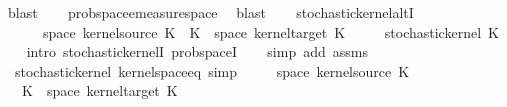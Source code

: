 \begin{isabellebody}
\ blast\isanewline
\ \ \isamarkupfalse%
\ prob{\isacharunderscore}{\kern0pt}space{\isachardot}{\kern0pt}emeasure{\isacharunderscore}{\kern0pt}space{\isacharunderscore}{\kern0pt}{}\ \isamarkupfalse%
\ blast\isanewline
\ \ \isamarkupfalse%
%
\endisatagproof
{\isafoldproof}%
%
\isadelimproof
\isanewline
%
\endisadelimproof
\isanewline
{}\isamarkupfalse%
\ stochastic{\isacharunderscore}{\kern0pt}kernel{\isacharunderscore}{\kern0pt}altI{\isacharcolon}{\kern0pt}\isanewline
\ \ \ {\isachardoublequoteopen}{\isasymAnd}{\isasymomega}{\isachardot}{\kern0pt}\ {\isasymomega}\ {\isasymin}\ space\ {\isacharparenleft}{\kern0pt}kernel{\isacharunderscore}{\kern0pt}source\ K{\isacharparenright}{\kern0pt}\ {\isasymLongrightarrow}\ K\ {\isasymomega}\ {\isacharparenleft}{\kern0pt}space\ {\isacharparenleft}{\kern0pt}kernel{\isacharunderscore}{\kern0pt}target\ K{\isacharparenright}{\kern0pt}{\isacharparenright}{\kern0pt}\ {\isacharequal}{\kern0pt}\ {}{\isachardoublequoteclose}\isanewline
\ \ \ {\isachardoublequoteopen}stochastic{\isacharunderscore}{\kern0pt}kernel\ K{\isachardoublequoteclose}\isanewline
%
\isadelimproof
\ \ %
\endisadelimproof
%
\isatagproof
{}\isamarkupfalse%
\ {\isacharparenleft}{\kern0pt}intro\ stochastic{\isacharunderscore}{\kern0pt}kernelI\ prob{\isacharunderscore}{\kern0pt}spaceI{\isacharparenright}{\kern0pt}\isanewline
\ \ \isamarkupfalse%
\ {\isacharparenleft}{\kern0pt}simp\ add{\isacharcolon}{\kern0pt}\ assms{\isacharparenright}{\kern0pt}%
\endisatagproof
{\isafoldproof}%
%
\isadelimproof
\isanewline
%
\endisadelimproof
\isanewline
{}\isamarkupfalse%
\ {\isacharparenleft}{\kern0pt}\ stochastic{\isacharunderscore}{\kern0pt}kernel{\isacharparenright}{\kern0pt}\ kernel{\isacharunderscore}{\kern0pt}space{\isacharunderscore}{\kern0pt}eq{\isacharunderscore}{\kern0pt}{}\ {\isacharbrackleft}{\kern0pt}simp{\isacharbrackright}{\kern0pt}{\isacharcolon}{\kern0pt}\isanewline
\ \ \ {\isachardoublequoteopen}{\isasymomega}\ {\isasymin}\ space\ {\isacharparenleft}{\kern0pt}kernel{\isacharunderscore}{\kern0pt}source\ K{\isacharparenright}{\kern0pt}{\isachardoublequoteclose}\isanewline
\ \ \ {\isachardoublequoteopen}K\ {\isasymomega}\ {\isacharparenleft}{\kern0pt}space\ {\isacharparenleft}{\kern0pt}kernel{\isacharunderscore}{\kern0pt}target\ K{\isacharparenright}{\kern0pt}{\isacharparenright}{\kern0pt}\ {\isacharequal}{\kern0pt}\ {}{\isachardoublequoteclose}\isanewline

\end{isabellebody}
